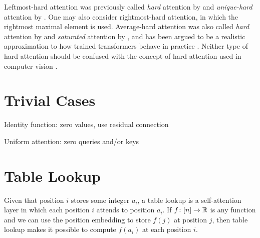 Leftmost-hard attention was previously called 
\emph{hard} attention by \citet{hahn-2020-theoretical} and
\emph{unique-hard} attention by \citet{hao-etal-2022-circuits}.
One may also consider rightmost-hard attention, in which the rightmost maximal element is used.
Average-hard attention was also called 
\emph{hard} attention by \citet{perez-etal-2021-turing} and
\emph{saturated} attention by \citet{merrill-etal-2021-saturated-transformers}, and has been argued to be a realistic approximation to how trained transformers behave in practice \citep{merrill-etal-2021-effects}.
Neither type of hard attention should be confused with the concept of hard attention used in computer vision \citep[e.g.,][]{xu+:2015}.

\section{Trivial Cases}

Identity function: zero values, use residual connection

Uniform attention: zero queries and/or keys


\section{Table Lookup}

Given that position $i$ stores some integer $a_i$, a table lookup is a self-attention layer in which each position $i$ attends to position $a_i$.
If $f \colon [n] \to \mathbb{R}$ is any function and we can use the position embedding to store $f(j)$ at position $j$, then table lookup makes it possible to compute $f(a_i)$ at each position $i$.

\iffalse
\subsection{Single query}

If every position has the same query ($q^{(i)} = q$ for all $i$) and there is a minimum distance $\delta$ between all keys ($|k^{(i)}-k^{(j)}| \ge \delta$ for all $i,j$), then we can just use a FFNN to compute $\mathbb{I}[k^{(i)} = q^{(i)}] \delta$, which is piecewise linear \citep{chiang-cholak-2022-parity}:
\begin{center}
  \begin{tikzpicture}
    \begin{axis}[xtick={-1,0,1},xticklabels={$-\delta$,$0$,$\delta$,ytick={0,1},yticklabels={$0$,$\delta$}}}]
      \addplot[mark=none] coordinates { (-5,0) (-1,0) (0,1) (1,0) (5,0) };
    \end{axis}
  \end{tikzpicture}
\end{center}
(Since this doesn't use attention, it doesn't strictly belong in this chapter.)
\fi

